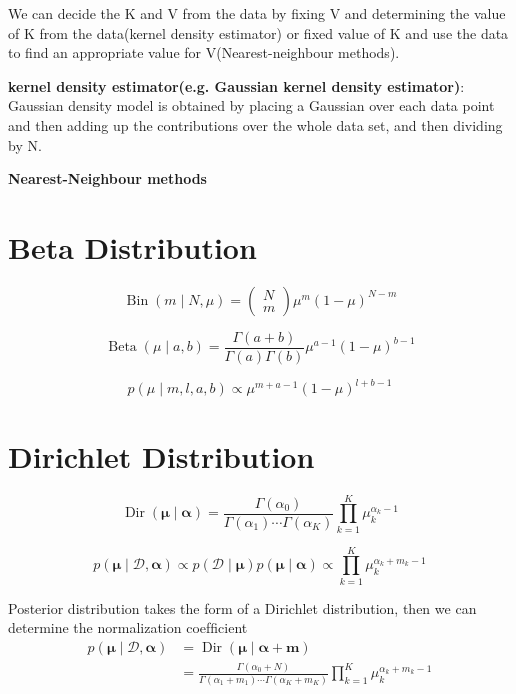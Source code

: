 \documentclass{article}
\begin{document}
We can decide the K and V from the data by fixing V and determining the value of K from the data(kernel density estimator) or ﬁxed value of K and use the data to ﬁnd an appropriate value for V(Nearest-neighbour methods).

\textbf{kernel density estimator(e.g. Gaussian kernel density estimator)}: Gaussian density model is obtained by placing a Gaussian over each data point and then adding up the contributions over the whole data set, and then dividing by N.

\textbf{Nearest-Neighbour methods}

\section{Beta Distribution}
$$
\operatorname{Bin}(m \mid N, \mu)=\left(\begin{array}{l}
N \\
m
\end{array}\right) \mu^{m}(1-\mu)^{N-m}
$$

$$
\operatorname{Beta}(\mu \mid a, b)=\frac{\Gamma(a+b)}{\Gamma(a) \Gamma(b)} \mu^{a-1}(1-\mu)^{b-1}
$$

$$
p(\mu \mid m, l, a, b) \propto \mu^{m+a-1}(1-\mu)^{l+b-1}
$$




\section{Dirichlet Distribution}
$$
\operatorname{Dir}(\boldsymbol{\mu} \mid \boldsymbol{\alpha})=\frac{\Gamma\left(\alpha_{0}\right)}{\Gamma\left(\alpha_{1}\right) \cdots \Gamma\left(\alpha_{K}\right)} \prod_{k=1}^{K} \mu_{k}^{\alpha_{k}-1}
$$

$$
p(\boldsymbol{\mu} \mid \mathcal{D}, \boldsymbol{\alpha}) \propto p(\mathcal{D} \mid \boldsymbol{\mu}) p(\boldsymbol{\mu} \mid \boldsymbol{\alpha}) \propto \prod_{k=1}^{K} \mu_{k}^{\alpha_{k}+m_{k}-1}
$$

Posterior distribution takes the form of a Dirichlet distribution, then we can determine the normalization coefﬁcient
$$
\begin{aligned}
p(\boldsymbol{\mu} \mid \mathcal{D}, \boldsymbol{\alpha}) &=\operatorname{Dir}(\boldsymbol{\mu} \mid \boldsymbol{\alpha}+\mathbf{m}) \\
&=\frac{\Gamma\left(\alpha_{0}+N\right)}{\Gamma\left(\alpha_{1}+m_{1}\right) \cdots \Gamma\left(\alpha_{K}+m_{K}\right)} \prod_{k=1}^{K} \mu_{k}^{\alpha_{k}+m_{k}-1}
\end{aligned}
$$
\end{document}

